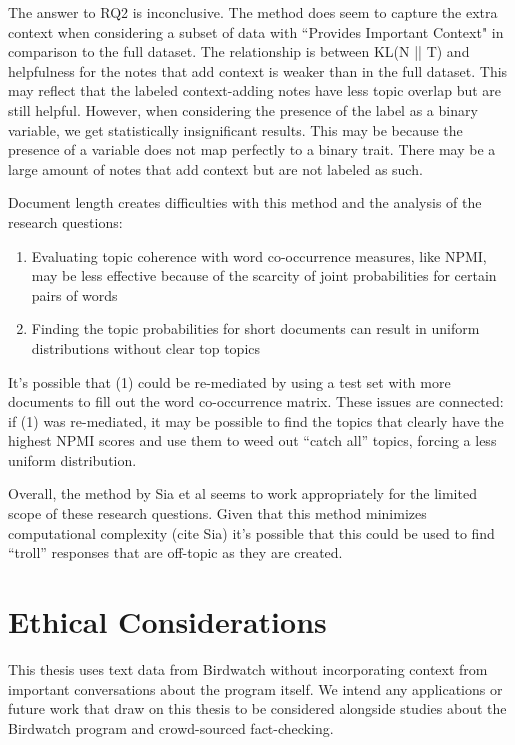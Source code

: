 \documentclass [11pt, proquest] {uwthesis}[2020/02/24]
\begin{document}
The answer to RQ2 is inconclusive. The method does seem to capture the extra context when considering a subset of data with ``Provides Important Context" in comparison to the full dataset. The relationship is between KL(N || T) and helpfulness for the notes that add context is weaker than in the full dataset. This may reflect that the labeled context-adding notes have less topic overlap but are still helpful. However, when considering the presence of the label as a binary variable, we get statistically insignificant results. This may be because the presence of a variable does not map perfectly to a binary trait. There may be a large amount of notes that add context but are not labeled as such.

Document length creates difficulties with this method and the analysis of the research questions:

\begin{enumerate}
    \item Evaluating topic coherence with word co-occurrence measures, like NPMI, may be less effective because of the scarcity of joint probabilities for certain pairs of words
    \item Finding the topic probabilities for short documents can result in uniform distributions without clear top topics
\end{enumerate}

It’s possible that (1) could be re-mediated by using a test set with more documents to fill out the word co-occurrence matrix. These issues are connected: if (1) was re-mediated, it may be possible to find the topics that clearly have the highest NPMI scores and use them to weed out “catch all” topics, forcing a less uniform distribution.

Overall, the method by Sia et al seems to work appropriately for the limited scope of these research questions. Given that this method minimizes computational complexity (cite Sia) it’s possible that this could be used to find “troll” responses that are off-topic as they are created.

\chapter{Ethical Considerations}\label{ethicalconsiderations}

This thesis uses text data from Birdwatch without incorporating context from important conversations about the program itself. We intend any applications or future work that draw on this thesis to be considered alongside studies about the Birdwatch program and crowd-sourced fact-checking.
\end{document}
